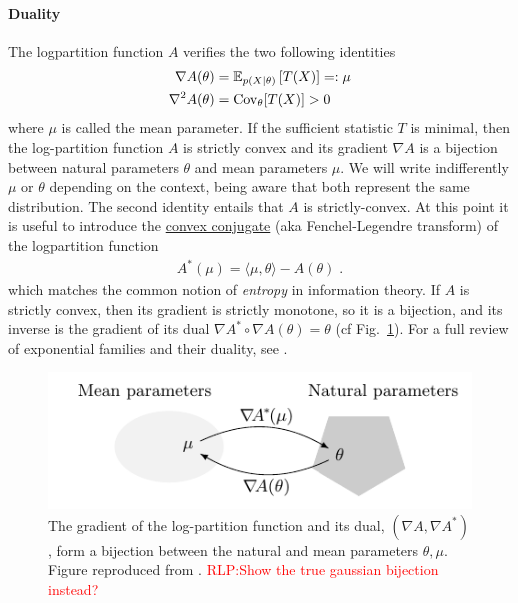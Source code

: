 \documentclass[twoside]{article}
\newcommand{\RLP}[1]{\textcolor{red}{RLP:#1}}
\newcommand*{\expect}[2][]{\ensuremath{\mathbb{E}_{#1} \left[ #2 \right] }} %
\newcommand{\logpart}{A}
\newcommand{\conj}{\logpart^*}
\newcommand{\natp}{\theta}
\newcommand{\meanp}{\mu}
\begin{document}
\paragraph{Duality}
The logpartition function $\logpart$ verifies the two following identities
\begin{align}
    \nabla\logpart(\natp) &=  \expect[p(X|\natp)]{T(X)} =: \meanp \\
    \nabla^2 \logpart(\natp) &= \Cov_\natp[T(X)] > 0
\end{align}
where $\meanp$ is called the mean parameter.
If the sufficient statistic $T$ is minimal, then the log-partition function $\logpart$ is strictly convex and its gradient $\nabla \logpart$ is a bijection between natural parameters $\natp$ and mean parameters $\mu$.
We will write indifferently $\mu$ or  $\natp$ depending on the context, being aware that both represent the same distribution.
The second identity entails that $\logpart$ is strictly-convex. 
At this point it is useful to introduce the \href{https://en.wikipedia.org/wiki/Convex_conjugate}{convex conjugate} (aka Fenchel-Legendre transform) of the logpartition function
\begin{align}
	\conj(\mu) = \langle \mu, \natp \rangle - \logpart(\natp) \; .
\end{align}
which matches the common notion of \textit{entropy} in information theory.
If $\logpart$ is strictly convex, then its gradient is strictly monotone, so it is a bijection, and its inverse is the gradient of its dual $\nabla\conj \circ \nabla\logpart(\natp) = \natp$ (cf Fig.~\ref{fig:duality}).
For a full review of exponential families and their duality, see \citet[Chapter 3]{wainwright2008graphical}.
\begin{figure}[ht]
	\centering
	\includegraphics{duality}
	\caption{The gradient of the log-partition function and its dual, $(\nabla \logpart, \nabla \conj)$, form a bijection between the natural and mean parameters $\natp, \meanp$. Figure reproduced from \citet{kunstner2020homeomorphic}.
		\RLP{Show the true gaussian bijection instead?}
	}
	\label{fig:duality}
\end{figure}
\end{document}
